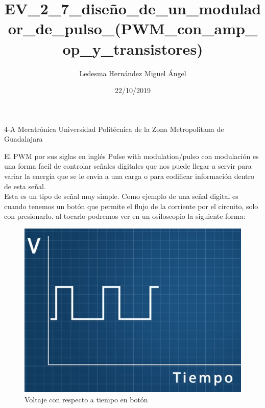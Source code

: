 \documentclass[letterpaper]{article}
\title{EV\_2\_7\_diseño\_de\_un\_modulador\_de\_pulso\_(PWM\_con\_amp\_op\_y\_transistores)}
\author{Ledesma Hernández Miguel Ángel}
\date{22/10/2019}
\begin{document}
\maketitle
\vspace{8cm}
\begin{center}
\begin{large}
4-A Mecatrónica
Universidad Politécnica de la Zona Metropolitana de Guadalajara
\end{large}
\end{center}
\newpage
\begin{large}
El PWM por sus siglas en inglés Pulse with modulation/pulso con modulación es una forma facil de controlar señales dígitales que nos puede llegar a servir para variar la energía que se le envia a una carga o para codificar información dentro de esta señal.\\
Esta es un tipo de señal muy simple. Como ejemplo de una señal digital es cuando tenemos un botón que permite el flujo de la corriente por el circuito, solo con presionarlo. al tocarlo podremos ver en un osiloscopio la siguiente forma:
\begin{figure}[hbtp]
\centering
\includegraphics[scale=.4]{bianriografica.png}
\caption{Voltaje con respecto a tiempo en botón}
\end{figure}


\end{large}
\end{document}
